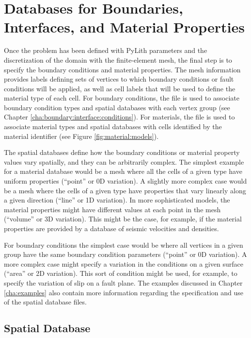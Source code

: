 \section{Databases for Boundaries, Interfaces, and Material Properties}
\label{sec:spatial:databases}

Once the problem has been defined with PyLith parameters and the
discretization of the domain with the finite-element mesh, the final
step is to specify the boundary conditions and material
properties. The mesh information provides labels defining sets of
vertices to which boundary conditions or fault conditions will be
applied, as well as cell labels that will be used to define the
material type of each cell. For boundary conditions, the
 file is used to associate boundary condition types and
spatial databases with each vertex group (see Chapter
\vref{cha:boundary:interface:conditions}).  For materials, the
 file is used to associate material types and spatial
databases with cells identified by the material identifier (see Figure
\vref{fig:material:models}).

The spatial databases define how the boundary conditions or material
property values vary spatially, and they can be arbitrarily complex.
The simplest example for a material database would be a mesh where all
the cells of a given type have uniform properties (``point'' or 0D
variation). A slightly more complex case would be a mesh where the
cells of a given type have properties that vary linearly along a given
direction (``line'' or 1D variation). In more sophisticated models,
the material properties might have different values at each point in
the mesh (``volume'' or 3D variation). This might be the case, for
example, if the material properties are provided by a database of
seismic velocities and densities.

For boundary conditions the simplest case would be where all vertices
in a given group have the same boundary condition parameters
(``point'' or 0D variation). A more complex case might specify a
variation in the conditions on a given surface (``area'' or 2D
variation). This sort of condition might be used, for example, to
specify the variation of slip on a fault plane. The examples discussed
in Chapter \vref{cha:examples} also contain more information regarding
the specification and use of the spatial database files.


\subsection{ Spatial Database}

